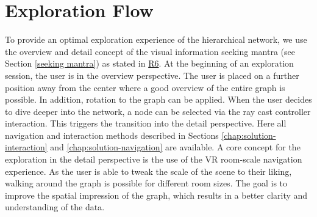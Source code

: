 \section{Exploration Flow}
\label{chap:ps-explorationFlow}
To provide an optimal exploration experience of the hierarchical network, we use the overview and detail concept of the visual information seeking mantra (see Section \ref{seeking mantra}) as stated in \hyperref[req:R6]{R6}. 
At the beginning of an exploration session, the user is in the overview perspective. The user is placed on a further position away from the center where a good overview of the entire graph is possible. In addition, rotation to the graph can be applied.
When the user decides to dive deeper into the network, a node can be selected via the ray cast controller interaction. This triggers the transition into the detail perspective. 
Here all navigation and interaction methods described in Sections \ref{chap:solution-interaction} and \ref{chap:solution-navigation}
are available. 
A core concept for the exploration in the detail perspective is the use of the VR room-scale navigation experience. As the user is able to tweak the scale of the scene to their liking, walking around the graph is possible for different room sizes. The goal is to improve the spatial impression of the graph, which results in a better clarity and understanding of the data.